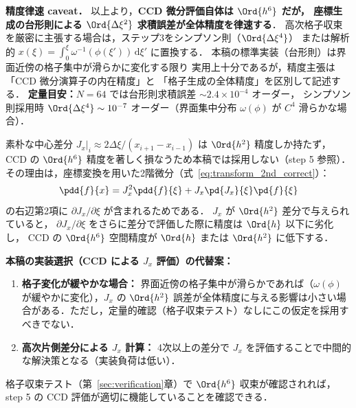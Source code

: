 \noindent\textbf{精度律速 caveat．}
\label{sec:grid_metric_caveat}
以上より，\textbf{CCD 微分評価自体は $\Ord{h^6}$ だが，
座標生成の台形則による $\Ord{\Delta\xi^2}$ 求積誤差が全体精度を律速する}．
高次格子収束を厳密に主張する場合は，ステップ3をシンプソン則（$\Ord{\Delta\xi^4}$）
または解析的 $x(\xi) = \int_0^\xi \omega^{-1}(\phi(\xi'))\,\mathrm{d}\xi'$ に置換する．
本稿の標準実装（台形則）は界面近傍の格子集中が滑らかに変化する限り
実用上十分であるが，精度主張は「CCD 微分演算子の内在精度」と
「格子生成の全体精度」を区別して記述する．
\textbf{定量目安：}$N=64$ では台形則求積誤差 $\sim 2.4\times 10^{-4}$ オーダー，
シンプソン則採用時 $\Ord{\Delta\xi^4}\sim 10^{-7}$ オーダー（界面集中分布
$\omega(\phi)$ が $C^4$ 滑らかな場合）．

\begin{tcolorbox}[warnbox, title={【重要】メトリクス係数 $J_x$ の精度と $\partial J_x/\partial\xi$ の評価}]
\label{box:grid_jx_accuracy}
素朴な中心差分 $J_x|_i \approx 2\Delta\xi/(x_{i+1}-x_{i-1})$ は $\Ord{h^2}$ 精度しか持たず，
CCD の $\Ord{h^6}$ 精度を著しく損なうため本稿では採用しない（step 5 参照）．
その理由は，座標変換を用いた2階微分（式~\eqref{eq:transform_2nd_correct}）：
\[
  \pdd{f}{x} = J_x^2 \pdd{f}{\xi} + J_x \pd{J_x}{\xi} \pd{f}{\xi}
\]
の右辺第2項に $\partial J_x/\partial \xi$ が含まれるためである．
$J_x$ が $\Ord{h^2}$ 差分で与えられていると，
$\partial J_x/\partial\xi$ をさらに差分で評価した際に精度は $\Ord{h}$ 以下に劣化し，
CCD の $\Ord{h^6}$ 空間精度が $\Ord{h}$ または $\Ord{h^2}$ に低下する．
\end{tcolorbox}

\textbf{本稿の実装選択（CCD による $J_x$ 評価）の代替案：}
\begin{enumerate}
  \item \textbf{格子変化が緩やかな場合：} 界面近傍の格子集中が滑らかであれば（$\omega(\phi)$ が緩やかに変化），$J_x$ の $\Ord{h^2}$ 誤差が全体精度に与える影響は小さい場合がある．ただし，定量的確認（格子収束テスト）なしにこの仮定を採用すべきでない．
  \item \textbf{高次片側差分による $J_x$ 計算：} 4次以上の差分で $J_x$ を評価することで中間的な解決策となる（実装負荷は低い）．
\end{enumerate}
格子収束テスト（第~\ref{sec:verification}章）で $\Ord{h^6}$ 収束が確認されれば，
step 5 の CCD 評価が適切に機能していることを確認できる．

